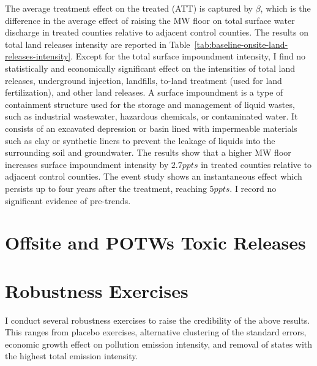 \documentclass[12pt, english]{article}
\begin{document}
    The average treatment effect on the treated (ATT) is captured by $\beta$, which is the difference in the average effect of raising the MW floor on total surface water discharge in treated counties relative to adjacent control counties. The results on total land releases intensity are reported in Table~\ref{tab:baseline-onsite-land-releases-intensity}. Except for the total surface impoundment intensity, I find no statistically and economically significant effect on the intensities of total land releases, underground injection, landfills, to-land treatment (used for land fertilization), and other land releases. A surface impoundment is a type of containment structure used for the storage and management of liquid wastes, such as industrial wastewater, hazardous chemicals, or contaminated water. It consists of an excavated depression or basin lined with impermeable materials such as clay or synthetic liners to prevent the leakage of liquids into the surrounding soil and groundwater. The results show that a higher MW floor increases surface impoundment intensity by $2.7ppts$ in treated counties relative to adjacent control counties. The event study shows an instantaneous effect which persists up to four years after the treatment, reaching $5ppts$. I record no significant evidence of pre-trends.
    


    \section{Offsite and POTWs Toxic Releases}\label{sec:offsite-and-potws-toxic-releases}
    
    
    


    \section{Robustness Exercises}\label{sec:robustness-exercises}
    I conduct several robustness exercises to raise the credibility of the above results. This ranges from placebo exercises, alternative clustering of the standard errors, economic growth effect on pollution emission intensity, and removal of states with the highest total emission intensity.
\end{document}
